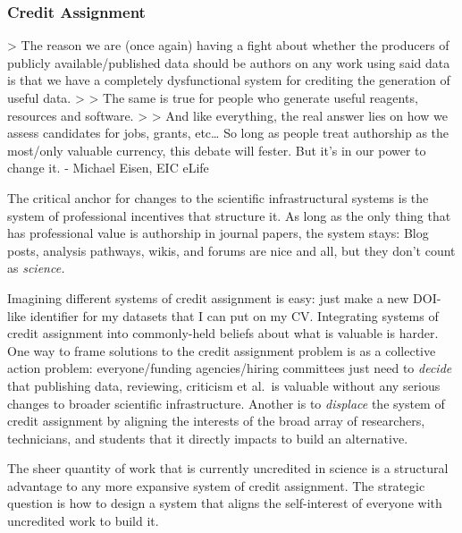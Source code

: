 \documentclass[10pt]{article}
\begin{document}
\hypertarget{credit-assignment}{%
\subsubsection{Credit Assignment}\label{credit-assignment}}


\begin{multicols}{2}
 \textgreater{} The reason we are (once again) having a
fight about whether the producers of publicly available/published data
should be authors on any work using said data is that we have a
completely dysfunctional system for crediting the generation of useful
data. \cite{eisenReasonWeAre2021}  \textgreater{} \textgreater{}
The same is true for people who generate useful reagents, resources and
software. \cite{eisenSameTruePeople2021}  \textgreater{}
\textgreater{} And like everything, the real answer lies on how we
assess candidates for jobs, grants, etc\ldots{} So long as people treat
authorship as the most/only valuable currency, this debate will fester.
But it's in our power to change it. - Michael Eisen, EIC eLife \cite{eisenEverythingRealAnswer2021} 

The critical anchor for changes to the scientific infrastructural
systems is the system of professional incentives that structure it. As
long as the only thing that has professional value is authorship in
journal papers, the system stays: Blog posts, analysis pathways, wikis,
and forums are nice and all, but they don't count as \emph{science.}

Imagining different systems of credit assignment is easy: just make a
new DOI-like identifier for my datasets that I can put on my CV.
Integrating systems of credit assignment into commonly-held beliefs
about what is valuable is harder. One way to frame solutions to the
credit assignment problem is as a collective action problem:
everyone/funding agencies/hiring committees just need to \emph{decide}
that publishing data, reviewing, criticism et al.~is valuable without
any serious changes to broader scientific infrastructure. Another is to
\emph{displace} the system of credit assignment by aligning the
interests of the broad array of researchers, technicians, and students
that it directly impacts to build an alternative.

The sheer quantity of work that is currently uncredited in science is a
structural advantage to any more expansive system of credit assignment.
The strategic question is how to design a system that aligns the
self-interest of everyone with uncredited work to build it.


\end{multicols}
\end{document}
